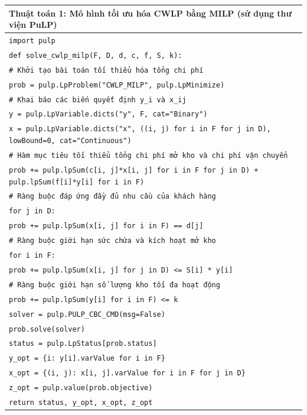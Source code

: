 \begin{table}[H]
\centering
\footnotesize
\begin{tabular}{p{15cm}}
\hline
\textbf{Thuật toán 1:} Mô hình tối ưu hóa CWLP bằng MILP (sử dụng thư viện PuLP) \\
\hline
\texttt{import pulp} \\
\texttt{def solve\_cwlp\_milp(F, D, d, c, f, S, k):} \\
\texttt{\quad \# Khởi tạo bài toán tối thiểu hóa tổng chi phí} \\
\texttt{\quad prob = pulp.LpProblem("CWLP\_MILP", pulp.LpMinimize)} \\
\texttt{\quad \# Khai báo các biến quyết định y\_i và x\_ij} \\
\texttt{\quad y = pulp.LpVariable.dicts("y", F, cat="Binary")} \\
\texttt{\quad x = pulp.LpVariable.dicts("x", ((i, j) for i in F for j in D), lowBound=0, cat="Continuous")} \\
\texttt{\quad \# Hàm mục tiêu tối thiểu tổng chi phí mở kho và chi phí vận chuyển} \\
\texttt{\quad prob += pulp.lpSum(c[i, j]*x[i, j] for i in F for j in D) + pulp.lpSum(f[i]*y[i] for i in F)} \\
\texttt{\quad \# Ràng buộc đáp ứng đầy đủ nhu cầu của khách hàng} \\
\texttt{\quad for j in D:} \\
\texttt{\quad \quad prob += pulp.lpSum(x[i, j] for i in F) == d[j]} \\
\texttt{\quad \# Ràng buộc giới hạn sức chứa và kích hoạt mở kho} \\
\texttt{\quad for i in F:} \\
\texttt{\quad \quad prob += pulp.lpSum(x[i, j] for j in D) <= S[i] * y[i]} \\
\texttt{\quad \# Ràng buộc giới hạn số lượng kho tối đa hoạt động} \\
\texttt{\quad prob += pulp.lpSum(y[i] for i in F) <= k} \\
\texttt{\quad solver = pulp.PULP\_CBC\_CMD(msg=False)} \\
\texttt{\quad prob.solve(solver)} \\
\texttt{\quad status = pulp.LpStatus[prob.status]} \\
\texttt{\quad y\_opt = \{i: y[i].varValue for i in F\}} \\
\texttt{\quad x\_opt = \{(i, j): x[i, j].varValue for i in F for j in D\}} \\
\texttt{\quad z\_opt = pulp.value(prob.objective)} \\
\texttt{\quad return status, y\_opt, x\_opt, z\_opt} \\
\hline
\end{tabular}
\end{table}

